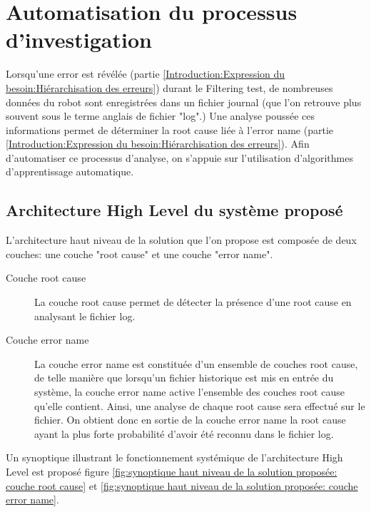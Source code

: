 \chapter{Automatisation du processus d'investigation}
\label{Automatisation du processus d'investigation}
\thispagestyle{fancy}
Lorsqu'une error est révélée (partie \ref{Introduction:Expression du besoin:Hiérarchisation des erreurs}) durant le Filtering test, de nombreuses données du robot sont enregistrées dans un fichier journal (que l'on retrouve plus souvent sous le terme anglais de fichier "log".) Une analyse poussée ces informations permet de déterminer la root cause liée à l'error name (partie \ref{Introduction:Expression du besoin:Hiérarchisation des erreurs}). Afin d'automatiser ce processus d'analyse, on s'appuie sur l'utilisation d'algorithmes d'apprentissage automatique. 

\section{Architecture High Level du système proposé}
\label{Automatisation du processus d'investigation: Achitecture High Level du système proposé}
L'architecture haut niveau de la solution que l'on propose est composée de deux couches: une couche "root cause" et une couche "error name".
\begin{description}
	\item [Couche root cause] La couche root cause permet de détecter la présence d'une root cause en analysant le fichier log.
	\item [Couche error name] La couche error name est constituée d'un ensemble de couches root cause, de telle manière que lorsqu'un fichier historique est mis en entrée du système, la couche error name active l'ensemble des couches root cause qu'elle contient. Ainsi, une analyse de chaque root cause sera effectué sur le fichier. On obtient donc en sortie de la couche error name la root cause ayant la plus forte probabilité d'avoir été reconnu dans le fichier log.
\end{description} 

Un synoptique illustrant le fonctionnement systémique de l'architecture High Level est proposé figure \ref{fig:synoptique haut niveau de la solution proposée: couche root cause} et \ref{fig:synoptique haut niveau de la solution proposée: couche error name}.

